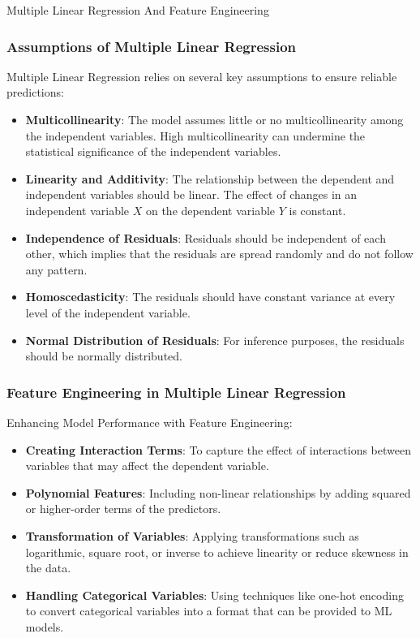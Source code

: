 \begin{notes}{Multiple Linear Regression And Feature Engineering}
    \subsubsection*{Assumptions of Multiple Linear Regression}
    
    Multiple Linear Regression relies on several key assumptions to ensure reliable predictions:
    \begin{itemize}
        \item \textbf{Multicollinearity}: The model assumes little or no multicollinearity among the independent variables. High multicollinearity can undermine the statistical significance of the independent variables.
        \item \textbf{Linearity and Additivity}: The relationship between the dependent and independent variables should be linear. The effect of changes in an independent variable $X$ on the dependent variable $Y$ is constant.
        \item \textbf{Independence of Residuals}: Residuals should be independent of each other, which implies that the residuals are spread randomly and do not follow any pattern.
        \item \textbf{Homoscedasticity}: The residuals should have constant variance at every level of the independent variable.
        \item \textbf{Normal Distribution of Residuals}: For inference purposes, the residuals should be normally distributed.
    \end{itemize}
    
    \subsubsection*{Feature Engineering in Multiple Linear Regression}
    
    Enhancing Model Performance with Feature Engineering:
    \begin{itemize}
        \item \textbf{Creating Interaction Terms}: To capture the effect of interactions between variables that may affect the dependent variable.
        \item \textbf{Polynomial Features}: Including non-linear relationships by adding squared or higher-order terms of the predictors.
        \item \textbf{Transformation of Variables}: Applying transformations such as logarithmic, square root, or inverse to achieve linearity or reduce skewness in the data.
        \item \textbf{Handling Categorical Variables}: Using techniques like one-hot encoding to convert categorical variables into a format that can be provided to ML models.
    \end{itemize}
    

\end{notes}
